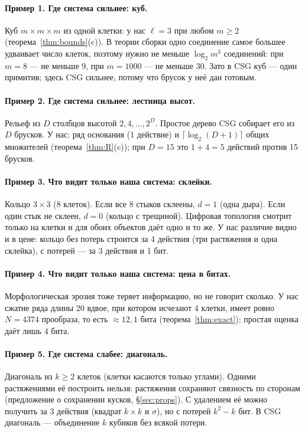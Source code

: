 \documentclass[11pt,a4paper]{article}
\theoremstyle{plain}
\theoremstyle{definition}
\theoremstyle{remark}
\begin{document}
\paragraph{Пример 1. Где система сильнее: куб.} Куб $m\times m\times m$ из одной клетки: у нас $\ell=3$ при любом $m\ge2$ (теорема~\ref{thm:bounds}(c)). В теории сборки \cite{assembly} одно соединение самое большее удваивает число клеток, поэтому нужно не меньше $\log_2 m^3$ соединений: при $m=8$ — не меньше $9$, при $m=1000$ — не меньше $30$. Зато в CSG \cite{requicha} куб — один примитив; здесь CSG сильнее, потому что брусок у неё дан готовым.

\paragraph{Пример 2. Где система сильнее: лестница высот.} Рельеф из $D$ столбцов высотой $2,4,\dots,2^D$. Простое дерево CSG собирает его из $D$ брусков. У нас: ряд основания (1 действие) и $\lceil\log_2(D+1)\rceil$ общих множителей (теорема~\ref{thm:R}(c)); при $D=15$ это $1+4=5$ действий против 15 брусков.

\paragraph{Пример 3. Что видит только наша система: склейки.} Кольцо $3\times3$ (8 клеток). Если все 8 стыков склеены, $d=1$ (одна дыра). Если один стык не склеен, $d=0$ (кольцо с трещиной). Цифровая топология \cite{kong} смотрит только на клетки и для обоих объектов даёт одно и то же. У нас различие видно и в цене: кольцо без потерь строится за 4 действия (три растяжения и одна склейка), с потерей — за 3 действия и 1 бит.

\paragraph{Пример 4. Что видит только наша система: цена в битах.} Морфологическая эрозия тоже теряет информацию, но не говорит сколько. У нас сжатие ряда длины 20 вдвое, при котором исчезают 4 клетки, имеет ровно $N=4374$ прообраза, то есть $\approx12{,}1$ бита (теорема~\ref{thm:exact}); простая оценка даёт лишь $4$ бита.

\paragraph{Пример 5. Где система слабее: диагональ.} Диагональ из $k\ge2$ клеток (клетки касаются только углами). Одними растяжениями её построить нельзя: растяжения сохраняют связность по сторонам (предложение о сохранении кусков, §\ref{sec:props}). С удалением её можно получить за 3 действия (квадрат $k\times k$ и $\sigma$), но с потерей $k^2-k$ бит. В CSG диагональ — объединение $k$ кубиков без всякой потери.
\end{document}
